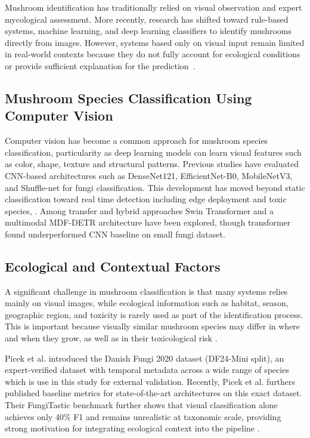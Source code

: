 \documentclass[journal,transmag]{IEEEtran}
\begin{document}
Mushroom identification has traditionally relied on visual observation and expert mycological assessment. More recently, research has shifted toward rule-based systems, machine learning, and deep learning classifiers to identify mushrooms directly from images. However, systems based only on visual input remain limited in real-world  contexts because they do not fully account for ecological conditions or provide sufficient explanation for the prediction~\cite{kuznetsov2026}.


\subsection{Mushroom Species Classification Using Computer Vision}
Computer vision has become a common approach for mushroom species classification, particularity as deep learning models can learn visual features such as color, shape, texture and structural patterns. Previous studies have evaluated CNN-based architectures such as  DenseNet121,  EfficientNet-B0, MobileNetV3, and Shuffle-net for fungi classification\cite{korkmaz2025}\cite{ozsari2024}. This development has moved beyond static classification toward real time detection including edge deployment and toxic species, \cite{duman2025}\cite{wei2025pmyolo}.
 Among transfer and hybrid approaches Swin Transformer and a multimodal MDF-DETR architecture have been explored, though transformer found underperformed CNN baseline on small fungi dataset\cite{ozsari2024}\cite{wang2025mdfdetr}. 
 

\subsection{\textbf{Ecological and Contextual Factors}}
A significant challenge in mushroom classification is that many systems relies mainly on visual images, while ecological information such as habitat, season, geographic region, and toxicity is rarely used as part of the identification process\cite{picek2025fungitastic}. This is important because visually similar mushroom species may differ in where and when they grow, as well as in their toxicological risk \cite{kuznetsov2026}. 

Picek et al.\cite{picek2022danishfungi} introduced the Danish Fungi 2020 dataset (DF24-Mini split), an expert-verified dataset with temporal metadata across a wide range of species which is use in this study for external validation. Recently, Picek et al. \cite{picek2025fungitastic} furthers published baseline metrics for state-of-the-art architectures on this exact dataset. Their FungiTastic benchmark further shows that visual classification alone achieves only 40\% F1 and remains unrealistic at taxonomic scale, providing strong motivation for integrating ecological context into the pipeline \cite{picek2025fungitastic}. 
\end{document}
